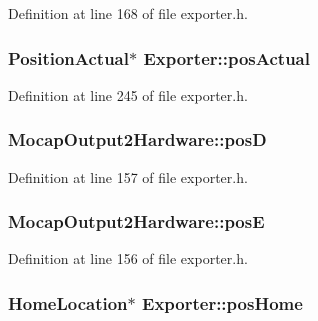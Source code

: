 Definition at line 168 of file exporter.\-h.

\hypertarget{group___mo_cap_plugin_ga48e371afeb39f31ab368d804798313f5}{
\subsubsection[{pos\-Actual}]{\setlength{\rightskip}{0pt plus 5cm}Position\-Actual$\ast$ Exporter\-::pos\-Actual\hspace{0.3cm}{\ttfamily [protected]}}}\label{group___mo_cap_plugin_ga48e371afeb39f31ab368d804798313f5}


Definition at line 245 of file exporter.\-h.

\hypertarget{group___mo_cap_plugin_ga60ef031584e000727250ea18e4e0ce36}{
\subsubsection[{pos\-D}]{ Mocap\-Output2\-Hardware\-::pos\-D}}\label{group___mo_cap_plugin_ga60ef031584e000727250ea18e4e0ce36}


Definition at line 157 of file exporter.\-h.

\hypertarget{group___mo_cap_plugin_gaeb486e47d519b624cd7b598eb6f33169}{
\subsubsection[{pos\-E}]{ Mocap\-Output2\-Hardware\-::pos\-E}}\label{group___mo_cap_plugin_gaeb486e47d519b624cd7b598eb6f33169}


Definition at line 156 of file exporter.\-h.

\hypertarget{group___mo_cap_plugin_ga9a7c0ada8bbd6bf8c95ca54f123befbe}{
\subsubsection[{pos\-Home}]{\setlength{\rightskip}{0pt plus 5cm}Home\-Location$\ast$ Exporter\-::pos\-Home\hspace{0.3cm}{\ttfamily [protected]}}}\label{group___mo_cap_plugin_ga9a7c0ada8bbd6bf8c95ca54f123befbe}


